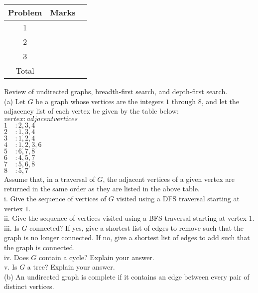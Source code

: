 \documentclass{assignment}
\begin{document}
\begin{center}
\renewcommand{\arraystretch}{2}
\begin{tabular}{|c|c|c|} \hline
Problem & Marks \\ \hline \hline
1 & \\ \hline
2 & \\ \hline
3 & \\ \hline \hline
Total & \\ \hline
\end{tabular}
\end{center}

\bigskip

\begin{problemlist}
\clearpage
\pbitem
\begin{problem}
Review of undirected graphs, breadth-first search, and depth-first search.\\
(a) Let $G$ be a graph whose vertices are the integers $1$ through $8$, and let the adjacency list of each vertex be given by the table below:\\
$vertex:adjacent vertices$\\
$1~~~~~:2,3,4$\\
$2~~~~~:1,3,4$\\
$3~~~~~:1,2,4$\\
$4~~~~~:1,2,3,6$\\
$5~~~~~:6,7,8$\\
$6~~~~~:4,5,7$\\
$7~~~~~:5,6,8$\\
$8~~~~~:5,7$\\
Assume that, in a traversal of $G$, the adjacent vertices of a given vertex are returned in the same order as they are listed in the above table.\\
i. Give the sequence of vertices of $G$ visited using a DFS traversal starting at vertex $1$.\\
ii. Give the sequence of vertices visited using a BFS traversal starting at vertex $1$.\\
iii. Is $G$ connected? If yes, give a shortest list of edges to remove such that the graph is no longer connected. If no, give a shortest list of edges to add such that the graph is connected.\\
iv. Does $G$ contain a cycle? Explain your answer.\\
v. Is $G$ a tree? Explain your answer.\\
(b) An undirected graph is complete if it contains an edge between every pair of distinct vertices.\\

\end{problem}
\end{problemlist}
\end{document}
